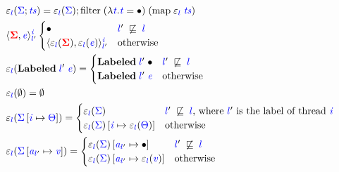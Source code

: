 \documentclass{llncs}
\newcommand{\Varid}[1]{\mathit{#1}}
\begin{document}
\begin{figure}
  \begin{align*}
  &\ensuremath{\varepsilon_{\ifc{l}}(\ifc{\Sigma};\ifc{\Varid{ts}})\mathrel{=}\varepsilon_{\ifc{l}}(\ifc{\Sigma});\text{filter}\;(\lambda \ifc{\Varid{t}}.\ifc{\Varid{t}}\mathrel{=}\bullet)\;(\text{map}\;\varepsilon_{\ifc{l}}\;\ifc{\Varid{ts}})}\\
  &\ensuremath{\langle \tar{\Sigma}, \ifc{\Varid{e}}\rangle^{\ifc{\Varid{i}}}_{\ifc{l}'}} \begin{cases}
  \ensuremath{\bullet} & \ensuremath{\ifc{l}'\;\not\flows{}\;\ifc{l}} \\
  \ensuremath{\langle \varepsilon_{\ifc{l}}(\tar{\Sigma}), \varepsilon_{\ifc{l}}(\ifc{\Varid{e}})\rangle^{\ifc{\Varid{i}}}_{\ifc{l}'}} & \text{otherwise}
  \end{cases} \\
  &\ensuremath{\varepsilon_{\ifc{l}}(\mathbf{Labeled}\;\ifc{l}'\;\ifc{\Varid{e}})}= \begin{cases}
  \ensuremath{\mathbf{Labeled}\;\ifc{l}'\;\bullet} & \ensuremath{\ifc{l}'\;\not\flows{}\;\ifc{l}} \\
  \ensuremath{\mathbf{Labeled}\;\ifc{l}'\;\ifc{\Varid{e}}} & \text{otherwise}
  \end{cases} \\
  &\ensuremath{\varepsilon_{\ifc{l}}(\emptyset)\mathrel{=}\emptyset}\\
  &\ensuremath{\varepsilon_{\ifc{l}}(\ifc{\Sigma}\left[\ifc{\Varid{i}}\mapsto{}\ifc{\Theta}\right])\mathrel{=}} \begin{cases}
  \ensuremath{\varepsilon_{\ifc{l}}(\ifc{\Sigma})} & \text{\ensuremath{\ifc{l}'\;\not\flows{}\;\ifc{l}}, where \ensuremath{\ifc{l}'} is the label of thread \ensuremath{\ifc{\Varid{i}}}}\\
  \ensuremath{\varepsilon_{\ifc{l}}(\ifc{\Sigma})\left[\ifc{\Varid{i}}\mapsto{}\varepsilon_{\ifc{l}}(\ifc{\Theta})\right]} & \text{otherwise}
  \end{cases} \\
  &\ensuremath{\varepsilon_{\ifc{l}}(\ifc{\Sigma}\left[\ifc{\Varid{a}}_{\ifc{l}'}\mapsto{}\ifc{\Varid{v}}\right])\mathrel{=}} \begin{cases}
  \ensuremath{\varepsilon_{\ifc{l}}(\ifc{\Sigma})\left[\ifc{\Varid{a}}_{\ifc{l}'}\mapsto{}\bullet\right]} & \text{\ensuremath{\ifc{l}'\;\not\flows{}\;\ifc{l}}}\\
  \ensuremath{\varepsilon_{\ifc{l}}(\ifc{\Sigma})\left[\ifc{\Varid{a}}_{\ifc{l}'}\mapsto{}\varepsilon_{\ifc{l}}(\ifc{\Varid{v}})\right]} & \text{otherwise}

\end{cases}
\end{align*}
\end{figure}
\end{document}

